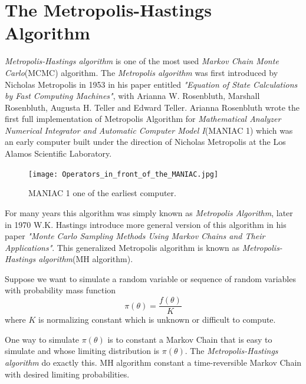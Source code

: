 \section{The Metropolis-Hastings Algorithm}

\textit{Metropolis-Hastings algorithm} is one of the most used \textit{Markov Chain Monte Carlo}(MCMC) algorithm.
The \textit{Metropolis algorithm} was first introduced by Nicholas Metropolis in 1953 in his paper entitled \textit{"Equation of State Calculations by Fast Computing Machines"}, with Arianna W. Rosenbluth, Marshall Rosenbluth, Augusta H. Teller and Edward Teller.
Arianna Rosenbluth wrote the first full implementation of Metropolis Algorithm for  \textit{Mathematical Analyzer Numerical Integrator and Automatic Computer Model I}(MANIAC 1) which was an early computer built under the direction of Nicholas Metropolis at the Los Alamos Scientific Laboratory.

\begin{figure}[H]
	\centering
	\texttt{[image: Operators\_in\_front\_of\_the\_MANIAC.jpg]}
	\caption{MANIAC 1 one of the earliest computer.}
	\label{MANIAC}
\end{figure}

For many years this algorithm was simply known as \textit{Metropolis Algorithm}, later in 1970 W.K. Hastings introduce more general version of this algorithm in his paper \textit{"Monte Carlo Sampling Methods Using Markov Chains and Their Applications"}. This generalized Metropolis algorithm is known as \textit{Metropolis-Hastings algorithm}(MH algorithm).

Suppose we want to simulate a random variable or sequence of random variables with probability mass function
\begin{equation}
	\pi(\theta) = \frac{f(\theta)}{K}
\end{equation}
where $ K $ is normalizing constant which is unknown or difficult to compute.

One way to simulate $ \pi(\theta) $ is to constant a Markov Chain that is easy to simulate and whose limiting distribution is $ \pi(\theta) $.
The \textit{Metropolis-Hastings algorithm} do exactly this. MH algorithm constant a time-reversible Markov Chain with desired limiting probabilities.

